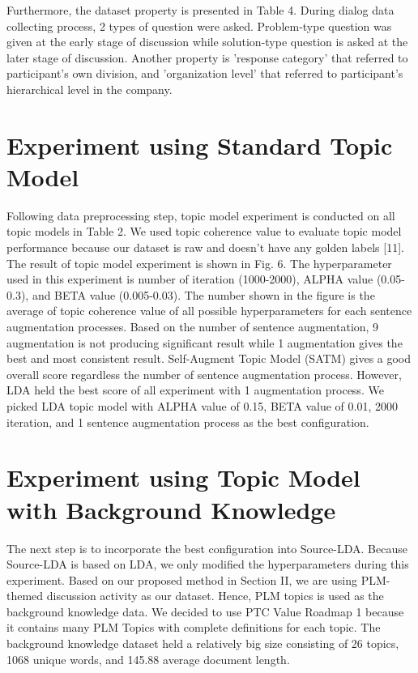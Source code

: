 \documentclass[senior]{IPSstyle}
\begin{document}
Furthermore, the dataset property is presented in Table 4. During dialog data collecting process, 2 types of question were asked. Problem-type question was given at the early stage of discussion while solution-type question is asked at the later stage of discussion. Another property is ’response category’ that referred to participant’s own division, and ’organization level’ that referred to participant’s hierarchical level in the company.

\section{Experiment using Standard Topic Model}

Following data preprocessing step, topic model experiment is conducted on all topic models in Table 2. We used topic coherence value to evaluate topic model performance because our dataset is raw and doesn’t have any golden labels [11]. The result of topic model experiment is shown in Fig. 6. The hyperparameter used in this experiment is number of iteration (1000-2000), ALPHA value (0.05-0.3), and BETA value (0.005-0.03). The number shown in the figure is the average of topic coherence value of all possible hyperparameters for each sentence augmentation processes. Based on the number of sentence augmentation, 9 augmentation is not producing significant result while 1 augmentation gives the best and most consistent result. Self-Augment Topic Model (SATM) gives a good overall score regardless the number of sentence augmentation process. However, LDA held the best score of all experiment with 1 augmentation process. We picked LDA topic model with ALPHA value of 0.15, BETA value of 0.01, 2000 iteration, and 1 sentence augmentation process as the best configuration.

\section{Experiment using Topic Model with Background Knowledge}

The next step is to incorporate the best configuration into Source-LDA. Because Source-LDA is based on LDA, we only modified the hyperparameters during this experiment. Based on our proposed method in Section II, we are using PLM-themed discussion activity as our dataset. Hence, PLM topics is used as the background knowledge data. We decided to use PTC Value Roadmap 1 because it contains many PLM Topics with complete definitions for each topic. The background knowledge dataset held a relatively big size consisting of 26 topics, 1068 unique words, and 145.88 average document length.
\end{document}
